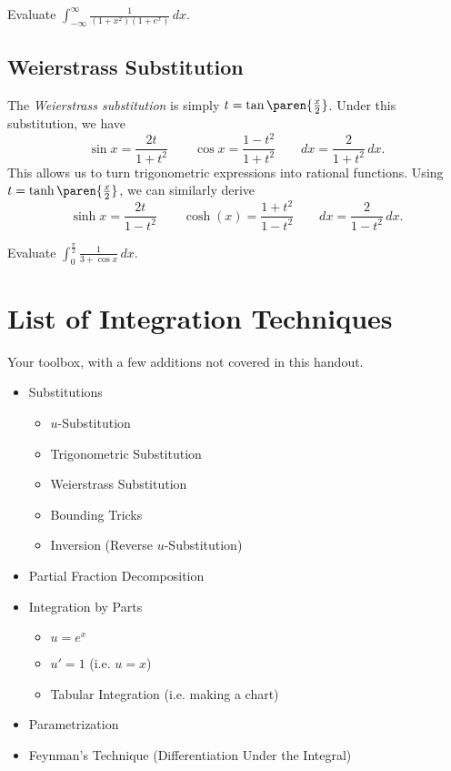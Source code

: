 \documentclass[mast]{lucky}
\begin{document}
\begin{exer}
Evaluate $\int_{-\infty}^{\infty} \frac{1}{(1+x^2)(1+e^x)}\,dx$.
\end{exer}

\subsection{Weierstrass Substitution}
The \emph{Weierstrass substitution} is simply $t=\tan\paren{\frac{x}{2}}$. Under this substitution, we have
\[\sin x=\frac{2t}{1+t^2} \qquad \cos x=\frac{1-t^2}{1+t^2} \qquad dx=\frac{2}{1+t^2}\,dx.\]
This allows us to turn trigonometric expressions into rational functions. Using $t=\tanh\paren{\frac{x}{2}}$, we can similarly derive
\[\sinh x=\frac{2t}{1-t^2} \qquad \cosh(x)=\frac{1+t^2}{1-t^2} \qquad dx=\frac{2}{1-t^2}\,dx.\]

\begin{exer}
Evaluate $\int_0^{\frac{\pi}{2}} \frac{1}{3+\cos x}\,dx$.
\end{exer}

\section{List of Integration Techniques}
Your toolbox, with a few additions not covered in this handout.
\begin{itemize}
    \item Substitutions
    \begin{itemize}
        \item $u$-Substitution
        \item Trigonometric Substitution
        \item Weierstrass Substitution
        \item Bounding Tricks
        \item Inversion (Reverse $u$-Substitution)
    \end{itemize}
    \item Partial Fraction Decomposition
    \item Integration by Parts
    \begin{itemize}
        \item $u=e^x$
        \item $u'=1$ (i.e. $u=x$)
        \item Tabular Integration (i.e. making a chart)
    \end{itemize}
    \item Parametrization
    \item Feynman's Technique (Differentiation Under the Integral)
\end{itemize}
\end{document}
